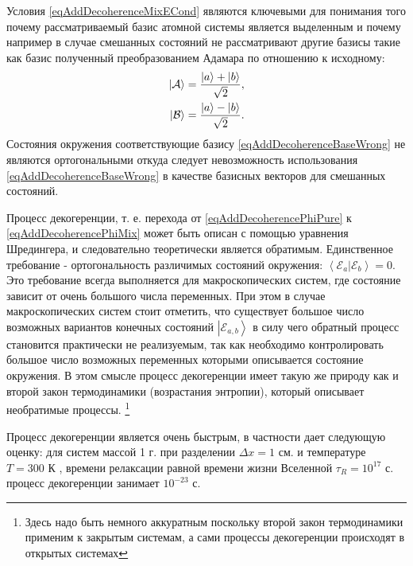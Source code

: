 Условия \eqref{eqAddDecoherenceMixECond} являются ключевыми для
понимания того почему рассматриваемый базис атомной системы является
выделенным и почему например в случае смешанных состояний не
рассматривают другие базисы такие как базис полученный преобразованием
Адамара по отношению к исходному:
\begin{eqnarray}
\left|\mathcal{A}\right> = \frac{\ket{a} + \ket{b}}
              {\sqrt{2}},
\nonumber \\
\left|\mathcal{B}\right> = \frac{\ket{a} - \ket{b}}
              {\sqrt{2}}.
\label{eqAddDecoherenceBaseWrong}
\end{eqnarray}
Состояния окружения соответствующие базису
\eqref{eqAddDecoherenceBaseWrong} не являются ортогональными откуда
следует невозможность использования \eqref{eqAddDecoherenceBaseWrong}
в качестве базисных векторов для смешанных состояний. 

Процесс декогеренции, т. е. перехода от
\eqref{eqAddDecoherencePhiPure} к \eqref{eqAddDecoherencePhiMix} может
быть описан с помощью уравнения Шредингера, и следовательно
теоретически является обратимым. Единственное требование -
ортогональность различимых состояний окружения: 
$\left<\mathcal{E}_a\right.\left|\mathcal{E}_b\right> = 0$. Это
требование всегда выполняется для макроскопических систем, где
состояние зависит от очень большого числа переменных. При этом в
случае макроскопических систем стоит отметить, что существует большое
число возможных вариантов конечных состояний
$\left|\mathcal{E}_{a,b}\right>$ 
в силу чего обратный процесс становится практически не реализуемым,
так как необходимо контролировать большое число возможных
переменных которыми описывается состояние окружения. В этом смысле
процесс декогеренции имеет такую же природу как и второй закон термодинамики 
(возрастания энтропии), который описывает
необратимые процессы.
\footnote{Здесь надо быть немного аккуратным
  поскольку второй закон термодинамики применим к закрытым системам, а
  сами процессы декогеренции происходят в открытых системах}

Процесс декогеренции является очень быстрым, в частности
\cite{bZurek02} дает следующую оценку: для систем массой 1
г. при разделении  $\Delta x = 1 \mbox{ см.}$ и температуре $T=300
\mbox{ К }$, времени релаксации равной времени жизни Вселенной
$\tau_R = 10^{17} \mbox{ с. }$ процесс декогеренции занимает $10^{-23}
\mbox{ с. }$

